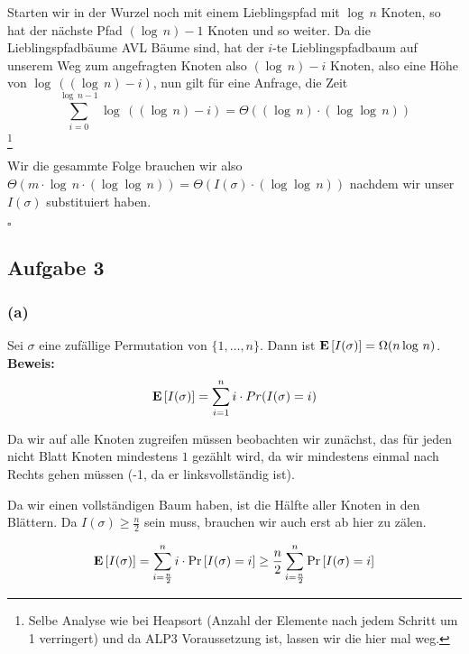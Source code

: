 \documentclass[11pt,a4paper,ngerman]{article}
\newcommand{\erw}[1]{\text{\bfseries E} \left[ #1 \right]}
\newcommand{\prob}[1]{\text{Pr}\left[ #1 \right]}
\begin{document}
Starten wir in der Wurzel noch mit einem Lieblingspfad mit $\log \, n$ Knoten, so hat der nächste Pfad $(\log \, n)-1$ Knoten und so weiter. Da die Lieblingspfadbäume AVL Bäume sind, hat der $i$-te Lieblingspfadbaum auf unserem Weg zum angefragten Knoten also $(\log \, n) - i$ Knoten,
also eine Höhe von $\log \, ((\log \, n) - i)$, nun gilt für eine Anfrage, die Zeit
$$
	\sum_{i=0}^{\log \, n - 1} \log \, ((\log \, n) - i) = \Theta((\log \,n) \cdot (\log \log \, n))
$$\footnote{Selbe Analyse wie bei Heapsort (Anzahl der Elemente nach jedem Schritt um 1 verringert) und da ALP3 Voraussetzung ist, lassen wir die hier mal weg.}

Wir die gesammte Folge brauchen wir also $\Theta(m \cdot \log \, n \cdot (\log \log \, n))= \Theta(I(\sigma) \cdot (\log \log \, n))$ nachdem wir
unser $I(\sigma)$  substituiert haben.

\mbox{}\hfill$\square$











\subsection*{Aufgabe 3}

\subsubsection*{(a)} Sei $\sigma$ eine zufällige Permutation von $\{ 1 , \ldots , n \}$. Dann ist $\erw{I(\sigma)} = \Omega(n \log \, n)$.\\

\noindent\textbf{Beweis:}\\


$$
	\erw{I(\sigma)} = \sum_{i=1}^n i \cdot Pr(I(\sigma) = i)
$$


Da wir auf alle Knoten zugreifen müssen beobachten wir zunächst, das für jeden nicht Blatt Knoten mindestens $1$ gezählt wird, da wir mindestens einmal nach Rechts gehen müssen (-1, da er linksvollständig ist).

Da wir einen vollständigen Baum haben, ist die Hälfte aller Knoten in den Blättern. Da $I(\sigma) \geq \frac{n}{2}$ sein muss,
brauchen wir auch erst ab hier zu zälen.

$$
	\erw{I(\sigma)} = \sum_{i=\frac{n}{2}}^n i \cdot \prob{I(\sigma) = i} \geq \frac{n}{2} \sum_{i=\frac{n}{2}}^n \prob{I(\sigma)=i}
$$
\end{document}

